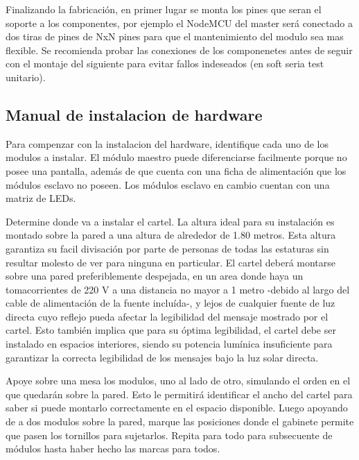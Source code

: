 { \color{red} Finalizando la fabricación, en primer lugar se monta los pines que seran el soporte a los componentes, por ejemplo el NodeMCU del master será conectado a dos tiras de pines de NxN pines para que el mantenimiento del modulo sea mas flexible.
Se recomienda probar las conexiones de los componenetes antes de seguir con el montaje del siguiente para evitar fallos indeseados (en soft seria test unitario).}



\subsection{Manual de instalacion de hardware}


Para compenzar con la instalacion del hardware, identifique cada uno de los modulos a instalar. El módulo maestro puede diferenciarse facilmente porque no posee una pantalla, además de que cuenta con una ficha de alimentación que los módulos esclavo no poseen. Los módulos esclavo en cambio cuentan con una matriz de LEDs.



Determine donde va a instalar el cartel. La altura ideal para su instalación es montado sobre la pared a una altura de alrededor de 1.80 metros. Esta altura garantiza su facil divisación por parte de personas de todas las estaturas sin resultar molesto de ver para ninguna en particular. El cartel deberá montarse sobre una pared preferiblemente despejada, en un area donde haya un tomacorrientes de 220 V a una distancia no mayor a 1 metro -debido al largo del cable de alimentación de la fuente incluída-, y lejos de cualquier fuente de luz directa cuyo reflejo pueda afectar la legibilidad del mensaje mostrado por el cartel. Esto también implica que para su óptima legibilidad, el cartel debe ser instalado en espacios interiores, siendo su potencia lumínica insuficiente para garantizar la correcta legibilidad de los mensajes bajo la luz solar directa.



Apoye sobre una mesa los modulos, uno al lado de otro, simulando el orden en el que quedarán sobre la pared. Esto le permitirá identificar el ancho del cartel para saber si puede montarlo correctamente en el espacio disponible. Luego apoyando de a dos modulos sobre la pared, marque las posiciones donde el gabinete permite que pasen los tornillos para sujetarlos. Repita para todo para subsecuente de módulos hasta haber hecho las marcas para todos.


